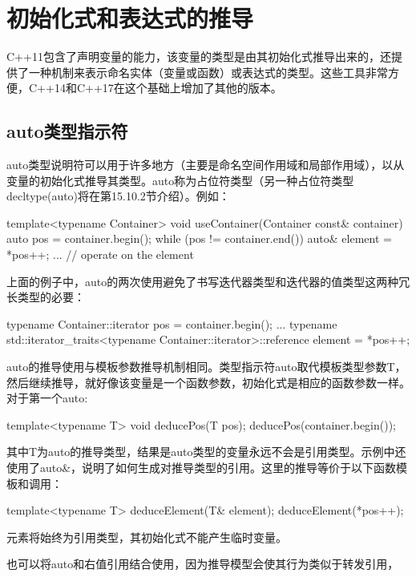 \section{初始化式和表达式的推导}

C++11包含了声明变量的能力，该变量的类型是由其初始化式推导出来的，还提供了一种机制来表示命名实体（变量或函数）或表达式的类型。这些工具非常方便，C++14和C++17在这个基础上增加了其他的版本。

\subsection{auto类型指示符}

auto类型说明符可以用于许多地方（主要是命名空间作用域和局部作用域），以从变量的初始化式推导其类型。auto称为占位符类型（另一种占位符类型decltype(auto)将在第15.10.2节介绍）。例如：

\begin{cpp}
template<typename Container>
void useContainer(Container const& container)
{
	auto pos = container.begin();
	while (pos != container.end()) {
		auto& element = *pos++;
		... // operate on the element
	}
}
\end{cpp}

上面的例子中，auto的两次使用避免了书写迭代器类型和迭代器的值类型这两种冗长类型的必要：

\begin{cpp}
typename Container::iterator pos = container.begin();
...
typename std::iterator_traits<typename Container::iterator>::reference
	element = *pos++;
\end{cpp}

auto的推导使用与模板参数推导机制相同。类型指示符auto取代模板类型参数T，然后继续推导，就好像该变量是一个函数参数，初始化式是相应的函数参数一样。对于第一个auto:

\begin{cpp}
template<typename T> void deducePos(T pos);
deducePos(container.begin());
\end{cpp}

其中T为auto的推导类型，结果是auto类型的变量永远不会是引用类型。示例中还使用了auto\&，说明了如何生成对推导类型的引用。这里的推导等价于以下函数模板和调用：

\begin{cpp}
template<typename T> deduceElement(T& element);
deduceElement(*pos++);
\end{cpp}

元素将始终为引用类型，其初始化式不能产生临时变量。

也可以将auto和右值引用结合使用，因为推导模型会使其行为类似于转发引用，

